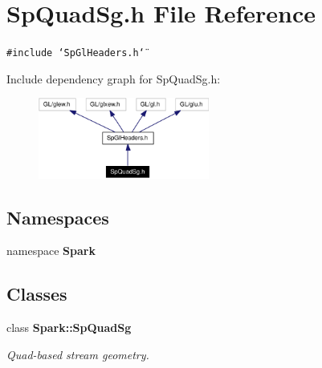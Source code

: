 \section{Sp\-Quad\-Sg.h File Reference}
\label{SpQuadSg_8h}
{\tt \#include \char`\"{}Sp\-Gl\-Headers.h\char`\"{}}\par


Include dependency graph for Sp\-Quad\-Sg.h:\begin{figure}[H]
\begin{center}
\leavevmode
\includegraphics[width=159pt]{SpQuadSg_8h__incl}
\end{center}
\end{figure}
\subsection*{Namespaces}
\begin{CompactItemize}
\item 
namespace {\bf Spark}
\end{CompactItemize}
\subsection*{Classes}
\begin{CompactItemize}
\item 
class {\bf Spark::Sp\-Quad\-Sg}
\begin{CompactList}\small\item\em Quad-based stream geometry. \item\end{CompactList}\end{CompactItemize}

